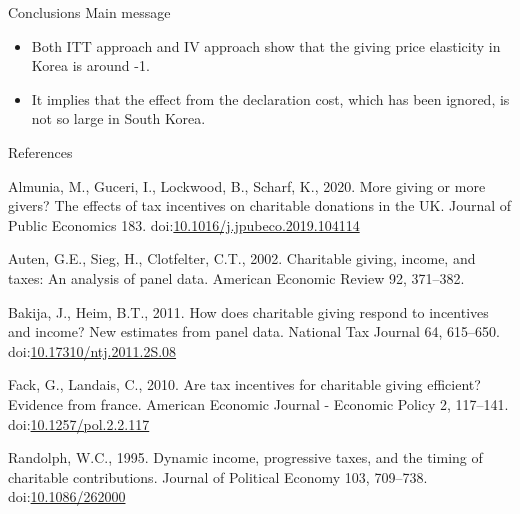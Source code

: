 \documentclass[
  ignorenonframetext,
  aspectratio=169,
]{beamer}
\providecommand{\tightlist}{%
  \setlength{\itemsep}{0pt}\setlength{\parskip}{0pt}}
\newlength{\cslhangindent}
\newlength{\cslentryspacingunit} %
\newenvironment{CSLReferences}[2] %
 {%
  \setlength{\parindent}{0pt}
  \ifodd #1
  \let\oldpar\par
  \def\par{\hangindent=\cslhangindent\oldpar}
  \fi
  \setlength{\parskip}{#2\cslentryspacingunit}
 }%
 {}
\begin{document}
\begin{frame}{Conclusions}
\protect\hypertarget{conclusions}{}
Main message

\begin{itemize}
\tightlist
\item
  Both ITT approach and IV approach show that the giving price elasticity in Korea is around -1.
\item
  It implies that the effect from the declaration cost, which has been ignored, is not so large in South Korea.
\end{itemize}
\end{frame}

\begin{frame}{References}
\protect\hypertarget{references}{}
\hypertarget{refs}{}
\begin{CSLReferences}{1}{0}
\leavevmode{}%
Almunia, M., Guceri, I., Lockwood, B., Scharf, K., 2020. More giving or more givers? The effects of tax incentives on charitable donations in the UK. Journal of Public Economics 183. doi:\href{https://doi.org/10.1016/j.jpubeco.2019.104114}{10.1016/j.jpubeco.2019.104114}

\leavevmode{}%
Auten, G.E., Sieg, H., Clotfelter, C.T., 2002. Charitable giving, income, and taxes: An analysis of panel data. American Economic Review 92, 371--382.

\leavevmode{}%
Bakija, J., Heim, B.T., 2011. How does charitable giving respond to incentives and income? New estimates from panel data. National Tax Journal 64, 615--650. doi:\href{https://doi.org/10.17310/ntj.2011.2S.08}{10.17310/ntj.2011.2S.08}

\leavevmode{}%
Fack, G., Landais, C., 2010. Are tax incentives for charitable giving efficient? Evidence from france. American Economic Journal - Economic Policy 2, 117--141. doi:\href{https://doi.org/10.1257/pol.2.2.117}{10.1257/pol.2.2.117}

\leavevmode{}%
Randolph, W.C., 1995. Dynamic income, progressive taxes, and the timing of charitable contributions. Journal of Political Economy 103, 709--738. doi:\href{https://doi.org/10.1086/262000}{10.1086/262000}

\end{CSLReferences}
\end{frame}
\end{document}
